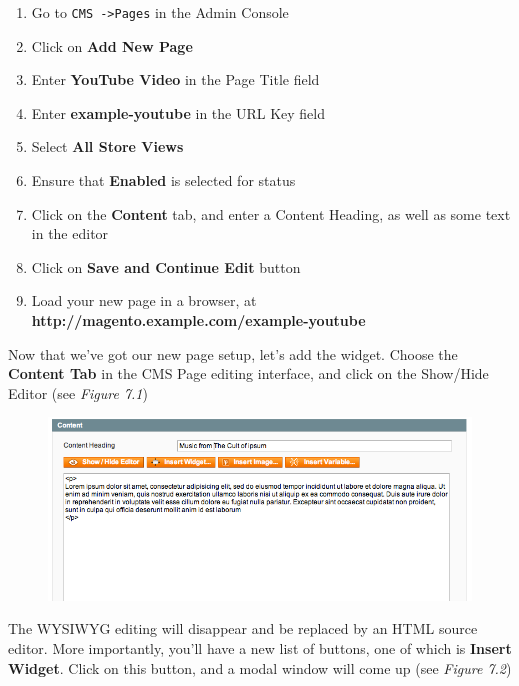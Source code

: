 \documentclass[oneside]{book}
\begin{document}
\begin{enumerate}
\item Go to \footnotesize\texttt{CMS -\textgreater  Pages} \normalsize  in the Admin Console
\item Click on \textbf{Add New Page}
\item Enter \textbf{YouTube Video} in the Page Title field
\item Enter \textbf{example-youtube} in the URL Key field
\item Select \textbf{All Store Views}
\item Ensure that \textbf{Enabled} is selected for status
\item Click on the \textbf{Content} tab, and enter a Content Heading, as well as some text in the editor
\item Click on \textbf{Save and Continue Edit} button
\item Load your new page in a browser, at \textbf{http://magento.example.com/example-youtube}
\end{enumerate}


Now that we've got our new page setup, let's add the widget. Choose the \textbf{Content Tab} in the CMS Page editing interface, and click on the Show/Hide Editor (see \emph{Figure 7.1})

\begin{figure}[htb]
\begin{center}
\leavevmode
\includegraphics[width=1\textwidth]{images/chapter7/show-hide.png}
\end{center}
\caption{}
\end{figure}


The WYSIWYG editing will disappear and be replaced by an HTML source editor.  More importantly, you'll have a new list of buttons, one of which is \textbf{Insert Widget}.  Click on this button, and a modal window will come up (see \emph{Figure 7.2})
\end{document}
